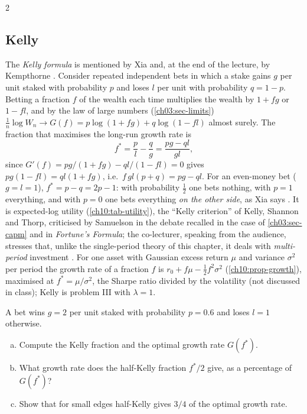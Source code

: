 \begin{paracol}{2}
\subsection{Kelly}
The \emph{Kelly formula} is mentioned by Xia and, at the end of the lecture, by Kempthorne . Consider repeated
independent bets in which a stake gains $g$ per unit staked with probability $p$ and loses $l$ per unit with
probability $q=1-p$. Betting a fraction $f$ of the wealth each time multiplies the wealth by $1+fg$ or $1-fl$, and by the
law of large numbers (\cref{ch03:sec-limits}) $\frac1n\log W_n\to G(f)=p\log(1+fg)+q\log(1-fl)$ almost surely. The
fraction that maximises the long-run growth rate is
\begin{equation}\label{ch10:eq-kelly}
  f^*=\frac pl-\frac qg=\frac{pg-ql}{gl},
\end{equation}
since $G'(f)=pg/(1+fg)-ql/(1-fl)=0$ gives $pg(1-fl)=ql(1+fg)$, i.e.\ $f\,gl(p+q)=pg-ql$. For an even-money bet
($g=l=1$), $f^*=p-q=2p-1$: with probability $\frac12$ one bets nothing, with $p=1$ everything, and with $p=0$ one bets
everything \emph{on the other side}, as Xia says . It is expected-log utility
(\cref{ch10:tab-utility}), the ``Kelly criterion'' of Kelly, Shannon and Thorp, criticised by Samuelson in the
debate recalled in the case of \cref{ch03:sec-capm} and in \emph{Fortune's Formula}; the co-lecturer, speaking from the audience,
stresses that, unlike the single-period theory of this chapter, it deals with \emph{multi-period} investment
. For one asset with Gaussian excess return $\mu$ and variance
$\sigma^2$ per period the growth rate of a fraction $f$ is $r_0+f\mu-\frac12f^2\sigma^2$
(\cref{ch10:prop-growth}), maximised at $f^*=\mu/\sigma^2$, the Sharpe ratio divided by the volatility
(not discussed in class); Kelly is problem III with $\lambda=1$.

\begin{exercise}
A bet wins $g=2$ per unit staked with probability $p=0.6$ and loses $l=1$ otherwise.
\begin{enumerate}[(a)]
  \item Compute the Kelly fraction and the
      optimal growth rate $G(f^*)$.
  \item What growth rate does the half-Kelly fraction $f^*/2$ give, as a percentage of $G(f^*)$?
  \item Show that for small edges
      half-Kelly gives $3/4$ of the optimal growth rate.
\end{enumerate}
\end{exercise}


\end{paracol}
